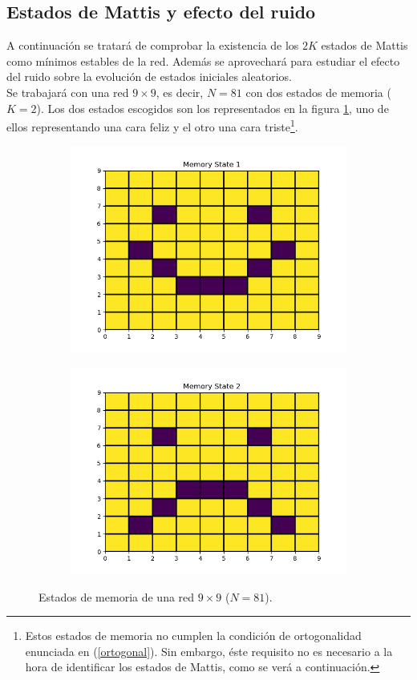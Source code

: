 \documentclass[titlepage,12pt]{article}
\numberwithin{equation}{section}
\begin{document}
	\subsection{Estados de Mattis y efecto del ruido}
	A continuación se tratará de comprobar la existencia de los $2K$ estados de Mattis como mínimos estables de la red. Además se aprovechará para estudiar el efecto del ruido sobre la evolución de estados iniciales aleatorios.
	\\
	Se trabajará con una red $9 \times 9$, es decir, $N = 81$ con dos estados de memoria ($K = 2$). Los dos estados escogidos son los representados en la figura \ref{faces}, uno de ellos representando una cara feliz y el otro una cara triste\footnote{Estos estados de memoria no cumplen la condición de ortogonalidad enunciada en (\ref{ortogonal}). Sin embargo, éste requisito no es necesario a la hora de identificar los estados de Mattis, como se verá a continuación.}.
	\begin{figure}
	    \centering
	    \begin{subfigure}{.5\textwidth}
	    \centering
	    \includegraphics[width=.75\linewidth]{state_9x9_1.png}
	    \end{subfigure}%
	    \begin{subfigure}{.5\linewidth}
	    \centering
	    \includegraphics[width=.75\linewidth]{state_9x9_2.png}
	    \end{subfigure}%
	    \caption{Estados de memoria de una red $9 \times 9$ ($N = 81$).}
	    \label{faces}
	\end{figure}
\end{document}
